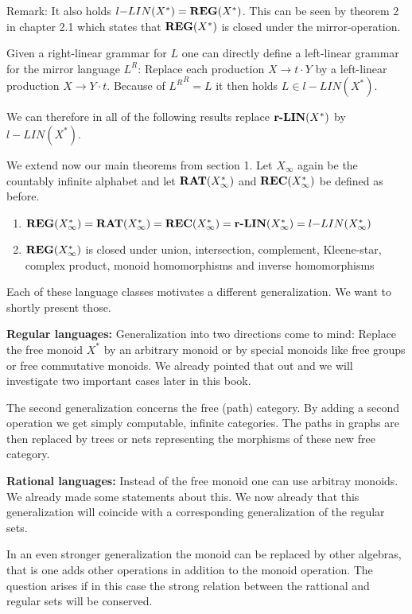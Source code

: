 Remark: It also holds $l{-}LIN(X^*) = \mbox{{\bf REG}}(X^*)$. This can be seen by theorem 2
in chapter 2.1 which states that $\mbox{{\bf REG}}(X^*)$ is closed under the
mirror-operation.

Given a right-linear grammar for $L$ one can directly define a left-linear
grammar for the mirror language $L^R$: Replace each production $X \to t \cdot Y$
by a left-linear production $X \to Y \cdot t$. Because of ${L^R}^R = L$ it then
holds $L \in l{-}LIN(X^*)$.

We can therefore in all of the following results replace $\mbox{{\bf r-LIN}}(X^*)$ by
$l{-}LIN(X^*)$.

We extend now our main theorems from section 1. Let $X_\infty$ again be the
countably infinite alphabet and let $\mbox{{\bf RAT}}(X_\infty^*)$ and $\mbox{{\bf REC}}(X_\infty^*)$ be
defined as before.

\begin{maintheorem}\leavevmode
\begin{enumerate}
  \item $ \mbox{{\bf REG}}(X_\infty^*) = \mbox{{\bf RAT}}(X_\infty^*) = \mbox{{\bf REC}}(X_\infty^*) =
  \mbox{{\bf r-LIN}}(X_\infty^*) = l{-}LIN(X_\infty^*) $
  \item $ \mbox{{\bf REG}}(X_\infty^*)$ is closed under union, intersection,
  complement, Kleene-star, complex product, monoid homomorphisms and inverse
  homomorphisms
\end{enumerate}
\end{maintheorem}

Each of these language classes motivates a different generalization. We want to
shortly present those.

{\bf Regular languages:} Generalization into two directions come to mind: Replace the
free monoid $X^*$ by an arbitrary monoid or by special monoids like free groups or
free commutative monoids. We already pointed that out and we will investigate
two important cases later in this book.

The second generalization concerns the free (path) category. By adding a second
operation we get simply computable, infinite categories. The paths in graphs are
then replaced by trees or nets representing the morphisms of these new free 
category.

{\bf Rational languages:} Instead of the free monoid one can use arbitray monoids. We
already made some statements about this. We now already that this generalization
will coincide with a corresponding generalization of the regular sets.

In an even stronger generalization the monoid can be replaced by other algebras,
that is one adds other operations in addition to the monoid operation. The
question arises if in this case the strong relation between the rattional and
regular sets will be conserved.

